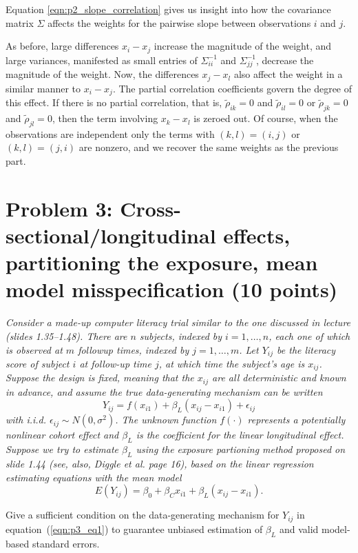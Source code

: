 \documentclass[11pt, letterpaper]{article}
\begin{document}
{\begin{enumerate}[(a)]
\begin{description}
    Equation \ref{eqn:p2_slope_correlation} gives us insight into how the
    covariance matrix $\Sigma$ affects the weights for the pairwise slope
    between observations $i$ and $j$.

    As before, large differences $x_i - x_j$ increase the magnitude of the
    weight, and large variances, manifested as small entries of
    $\Sigma_{ii}^{-1}$ and $\Sigma_{jj}^{-1}$, decrease the magnitude of the
    weight. Now, the differences $x_j - x_l$ also affect the weight in a similar
    manner to $x_i - x_j$. The partial correlation coefficients govern the
    degree of this effect. If there is no partial correlation, that is,
    $\tilde{\rho}_{ik} = 0$ and $\tilde{\rho}_{il} = 0$ or
    $\tilde{\rho}_{jk} = 0$ and $\tilde{\rho}_{jl} = 0$, then the term involving
    $x_{k} - x_{l}$ is zeroed out. Of course, when the observations are
    independent only the terms with $\left(k,l\right) = \left(i,j\right)$ or
    $\left(k,l\right) = \left(j,i\right)$ are nonzero, and we recover the same
    weights as the previous part.
  \end{description}
\end{enumerate} 


\section*{Problem 3: Cross-sectional/longitudinal effects, partitioning the exposure, mean model misspecification (10 points)}
{\em Consider a made-up computer literacy trial similar to the one discussed in lecture (slides 1.35--1.48).  There are $n$ subjects, indexed by $i=1,\ldots,n$, each one of which is observed at
$m$ followup times, indexed by $j=1,\ldots,m$.  Let $Y_{ij}$ be the literacy score of subject $i$ at follow-up time $j$, at which time the subject's age is $x_{ij}$.  Suppose the design is fixed, meaning that the $x_{ij}$ are all
deterministic and known in advance, and assume the true data-generating
mechanism can be written
\begin{equation}
\label{eqn:p3_eq1}
Y_{ij}=f(x_{i1})+\beta_L(x_{ij}-x_{i1})+\epsilon_{ij}
\end{equation}
with i.i.d. $\epsilon_{ij}\sim N(0,\sigma^2)$.  The unknown function $f(\cdot)$ 
represents a potentially nonlinear cohort effect and $\beta_L$ is the coefficient for the 
linear longitudinal effect.
Suppose we try to estimate $\beta_L$ using 
the exposure partioning method proposed on slide 1.44
(see, also, Diggle et al. page 16), based on the linear regression estimating equations
with the mean model
\begin{equation}
\label{eqn:p3_eq2}
E(Y_{ij})=\beta_0 + \beta_C x_{i1} + \beta_L (x_{ij}-x_{i1}).
\end{equation}}
\begin{enumerate}[(a)]
{\em \item Give a sufficient condition on the data-generating mechanism for $Y_{ij}$ in equation~(\ref{eqn:p3_eq1}) to guarantee
  unbiased estimation of $\beta_L$ and valid model-based standard errors.}


\end{enumerate}}
\end{document}
